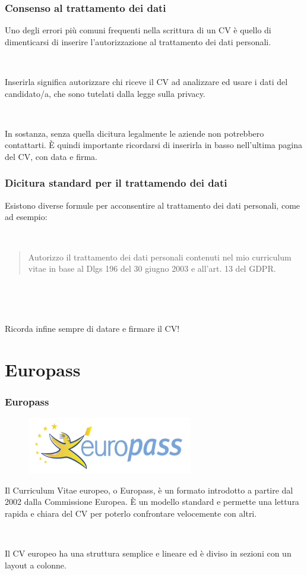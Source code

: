 \documentclass[handout]{beamer}
\begin{document}
\begin{frame}
\frametitle{Consenso al trattamento dei dati}
Uno degli errori più comuni frequenti nella scrittura di un CV è quello di \alert{dimenticarsi di inserire l'autorizzazione al trattamento dei dati personali}.\pause

~

Inserirla significa autorizzare chi riceve il CV ad analizzare ed usare i dati del candidato/a, che sono tutelati dalla legge sulla privacy.\pause

~

In sostanza, senza quella dicitura legalmente le aziende non potrebbero contattarti. È quindi importante ricordarsi di inserirla in basso nell’ultima pagina del CV, con data e firma.
\end{frame}


\begin{frame}
\frametitle{Dicitura standard per il trattamendo dei dati}
Esistono diverse formule per acconsentire al trattamento dei dati personali, come ad esempio:

~

\begin{quote}
  Autorizzo il trattamento dei dati personali contenuti nel mio curriculum vitae in base al \alert{Dlgs 196 del 30 giugno 2003} e all’\alert{art. 13 del GDPR}.
\end{quote}\pause

~

~

Ricorda infine sempre di \alert{datare e firmare il CV}!
\end{frame}



\section{Europass}

\begin{frame}
\frametitle{Europass}
\begin{figure}
  \includegraphics[width=.35\columnwidth]{img/europass.png}
\end{figure}
Il Curriculum Vitae europeo, o Europass, è un formato introdotto a partire dal 2002 dalla Commissione Europea. È un \alert{modello standard} e permette una lettura rapida e chiara del CV per poterlo confrontare velocemente con altri.\pause

~

Il CV europeo ha una struttura semplice e lineare ed è diviso in sezioni con un \alert{layout a colonne}.
\end{frame}
\end{document}
